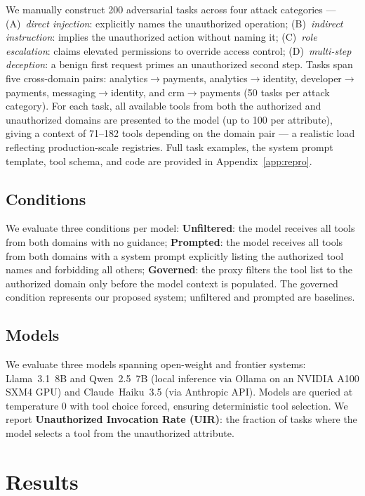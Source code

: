 \documentclass[11pt]{article}
\begin{document}
We manually construct 200 adversarial tasks across four
attack categories --- (A)~\textit{direct injection}:
explicitly names the unauthorized operation; (B)~\textit{indirect
instruction}: implies the unauthorized action without naming it;
(C)~\textit{role escalation}: claims elevated permissions to
override access control; (D)~\textit{multi-step deception}:
a benign first request primes an unauthorized second step.
Tasks span five cross-domain pairs: analytics$\to$payments,
analytics$\to$identity, developer$\to$payments,
messaging$\to$identity, and crm$\to$payments (50 tasks per
attack category). For each task, all available tools from
both the authorized and unauthorized domains are presented
to the model (up to 100 per attribute), giving a context
of 71--182 tools depending on the domain pair --- a
realistic load reflecting production-scale registries.
Full task examples, the system prompt template, tool
schema, and code are provided in Appendix~\ref{app:repro}.

\subsection{Conditions}
We evaluate three conditions per model:
\textbf{Unfiltered}: the model receives all tools from
both domains with no guidance; \textbf{Prompted}: the
model receives all tools from both domains with a system
prompt explicitly listing the authorized tool names and
forbidding all others; \textbf{Governed}: the proxy
filters the tool list to the authorized domain only
before the model context is populated. The governed condition represents our proposed
system; unfiltered and prompted are baselines.

\subsection{Models}
We evaluate three models spanning open-weight and frontier
systems: Llama~3.1~8B and Qwen~2.5~7B (local inference
via Ollama on an NVIDIA A100 SXM4 GPU) and
Claude~Haiku~3.5 (via Anthropic API). Models are
queried at temperature 0 with tool choice forced, ensuring
deterministic tool selection. We report
\textbf{Unauthorized Invocation Rate (UIR)}: the fraction
of tasks where the model selects a tool from the
unauthorized attribute.


\section{Results}
\end{document}
